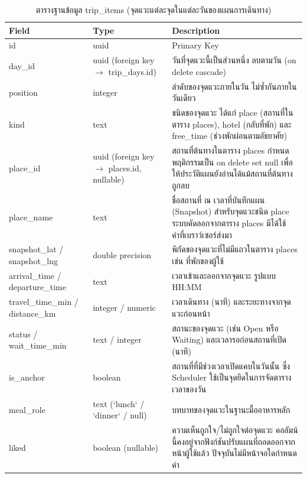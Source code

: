\begin{table}[H]
\centering
\caption{ตารางฐานข้อมูล trip\_items (จุดแวะแต่ละจุดในแต่ละวันของแผนการเดินทาง)}
\label{tab:db_tripitems}
\begin{tabular}{|p{3.6cm}|p{2.6cm}|p{6.8cm}|}
\hline
\textbf{Field} & \textbf{Type} & \textbf{Description} \\
\hline
id & uuid & Primary Key \\ \hline
day\_id & uuid (foreign key $\to$ trip\_days.id) & วันที่จุดแวะนี้เป็นส่วนหนึ่ง ลบตามวัน (on delete cascade) \\ \hline
position & integer & ลำดับของจุดแวะภายในวัน ไม่ซ้ำกันภายในวันเดียว \\ \hline
kind & text & ชนิดของจุดแวะ ได้แก่ place (สถานที่ในตาราง places), hotel (กลับที่พัก) และ free\_time (ช่วงพักผ่อนตามอัธยาศัย) \\ \hline
place\_id & uuid (foreign key $\to$ places.id, nullable) & สถานที่ต้นทางในตาราง places กำหนดพฤติกรรมเป็น on delete set null เพื่อให้ประวัติแผนยังอ่านได้แม้สถานที่ต้นทางถูกลบ \\ \hline
place\_name & text & ชื่อสถานที่ ณ เวลาที่บันทึกแผน (Snapshot) สำหรับจุดแวะชนิด place ระบบคัดลอกจากตาราง places มิได้ใช้ค่าที่เบราว์เซอร์ส่งมา \\ \hline
snapshot\_lat / snapshot\_lng & double precision & พิกัดของจุดแวะที่ไม่มีแถวในตาราง places เช่น ที่พักของผู้ใช้ \\ \hline
arrival\_time / departure\_time & text & เวลาเข้าและออกจากจุดแวะ รูปแบบ HH:MM \\ \hline
travel\_time\_min / distance\_km & integer / numeric & เวลาเดินทาง (นาที) และระยะทางจากจุดแวะก่อนหน้า \\ \hline
status / wait\_time\_min & text / integer & สถานะของจุดแวะ (เช่น Open หรือ Waiting) และเวลารอก่อนสถานที่เปิด (นาที) \\ \hline
is\_anchor & boolean & สถานที่ที่มีช่วงเวลาเปิดแคบในวันนั้น ซึ่ง Scheduler ใช้เป็นจุดยึดในการจัดตารางเวลาของวัน \\ \hline
meal\_role & text (`lunch` / `dinner` / null) & บทบาทของจุดแวะในฐานะมื้ออาหารหลัก \\ \hline
liked & boolean (nullable) & ความเห็นถูกใจ/ไม่ถูกใจต่อจุดแวะ คอลัมน์นี้คงอยู่จากฟังก์ชันปรับแผนที่ถอดออกจากหน้าผู้ใช้แล้ว ปัจจุบันไม่มีหน้าจอใดกำหนดค่า \\
\hline
\end{tabular}
\end{table}

